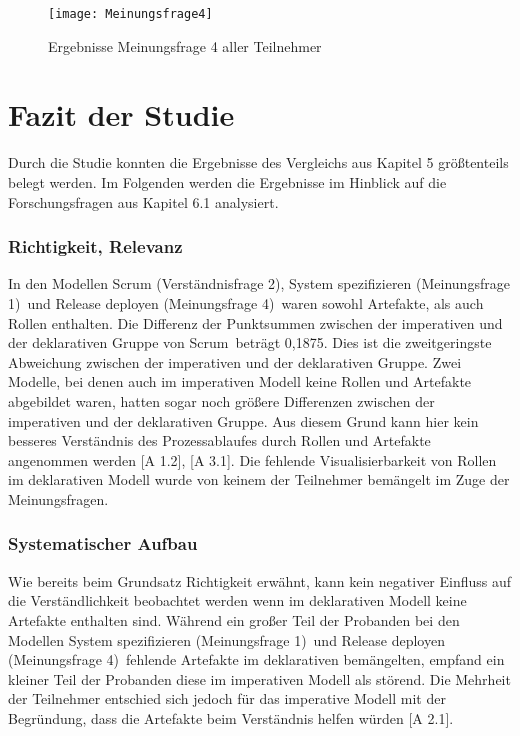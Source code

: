 \begin{figure}[htp]
\begin{center}
  \texttt{[image: Meinungsfrage4]} %
  \caption{Ergebnisse Meinungsfrage 4 aller Teilnehmer}
  \label{fig:Meinungsfrage4}
\end{center}
\end{figure}


\clearpage

\section{Fazit der Studie}

Durch die Studie konnten die Ergebnisse des Vergleichs aus Kapitel 5 größtenteils belegt werden. Im Folgenden werden die Ergebnisse im Hinblick auf die Forschungsfragen aus Kapitel 6.1 analysiert.\newline

\subsubsection{Richtigkeit, Relevanz}


In den Modellen \grqq Scrum (Verständnisfrage 2)\grqq, \grqq System spezifizieren (Meinungsfrage 1)\grqq \ und \grqq Release deployen (Meinungsfrage 4)\grqq \ waren sowohl Artefakte, als auch Rollen enthalten. Die Differenz der Punktsummen zwischen der imperativen und der deklarativen Gruppe von \grqq Scrum\grqq \ beträgt 0,1875. Dies ist die zweitgeringste Abweichung zwischen der imperativen und der deklarativen Gruppe. Zwei Modelle, bei denen auch im imperativen Modell keine Rollen und Artefakte abgebildet waren, hatten sogar noch größere Differenzen zwischen der imperativen und der deklarativen Gruppe. Aus diesem Grund kann hier kein besseres Verständnis des Prozessablaufes durch Rollen und Artefakte angenommen werden [A 1.2], [A 3.1]. \newline
Die fehlende Visualisierbarkeit von Rollen im deklarativen Modell wurde von keinem der Teilnehmer bemängelt im Zuge der Meinungsfragen.\newline



\subsubsection{Systematischer Aufbau}

Wie bereits beim Grundsatz Richtigkeit erwähnt, kann kein negativer Einfluss auf die Verständlichkeit beobachtet werden wenn im deklarativen Modell keine Artefakte enthalten sind.\newline
Während ein großer Teil der Probanden bei den Modellen \grqq System spezifizieren (Meinungsfrage 1)\grqq \ und \grqq Release deployen (Meinungsfrage 4)\grqq \ fehlende Artefakte im deklarativen bemängelten, empfand ein kleiner Teil der Probanden diese im imperativen Modell als störend. Die Mehrheit der Teilnehmer entschied sich jedoch für das imperative Modell mit der Begründung, dass die Artefakte beim Verständnis helfen würden [A 2.1]. 

